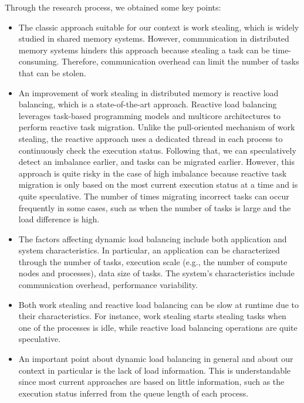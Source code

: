 Through the research process, we obtained some key points:
\begin{itemize}
	\item The classic approach suitable for our context is work stealing, which is widely studied in shared memory systems. However, communication in distributed memory systems hinders this approach because stealing a task can be time-consuming. Therefore, communication overhead can limit the number of tasks that can be stolen.
	
	\item An improvement of work stealing in distributed memory is reactive load balancing, which is a state-of-the-art approach. Reactive load balancing leverages task-based programming models and multicore architectures to perform reactive task migration. Unlike the pull-oriented mechanism of work stealing, the reactive approach uses a dedicated thread in each process to continuously check the execution status. Following that, we can speculatively detect an imbalance earlier, and tasks can be migrated earlier. However, this approach is quite risky in the case of high imbalance because reactive task migration is only based on the most current execution status at a time and is quite speculative. The number of times migrating incorrect tasks can occur frequently in some cases, such as when the number of tasks is large and the load difference is high.
	
	\item The factors affecting dynamic load balancing include both application and system characteristics. In particular, an application can be characterized through the number of tasks, execution scale (e.g., the number of compute nodes and processes), data size of tasks. The system's characteristics include communication overhead, performance variability.
	
	\item Both work stealing and reactive load balancing can be slow at runtime due to their characteristics. For instance, work stealing starts stealing tasks when one of the processes is idle, while reactive load balancing operations are quite speculative.
	
	\item An important point about dynamic load balancing in general and about our context in particular is the lack of load information. This is understandable since most current approaches are based on little information, such as the execution status inferred from the queue length of each process.
\end{itemize}

